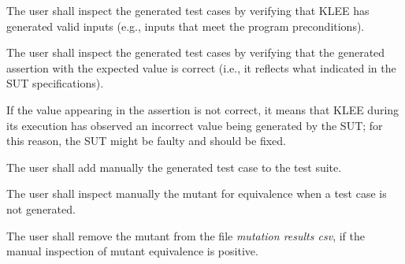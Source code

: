 \RQ{} The user shall inspect the generated test cases by verifying that KLEE has generated valid inputs (e.g., inputs that meet the program preconditions).


\RQ{} The user shall inspect the generated test cases by verifying that the generated assertion with the expected value is correct (i.e., it reflects what indicated in the SUT specifications). 

\remark If the value appearing in the assertion is not correct, it means that KLEE during its execution has observed an incorrect value being generated by the SUT; for this reason, the SUT might be faulty and should be fixed.



\RQ{} The user shall add manually the generated test case to the test suite.


\RQ{} The user shall inspect manually the mutant for equivalence when a test case is not generated.

\RQ{} The user shall remove the mutant from the file \emph{mutation results csv}, if the manual inspection of mutant equivalence is positive.


